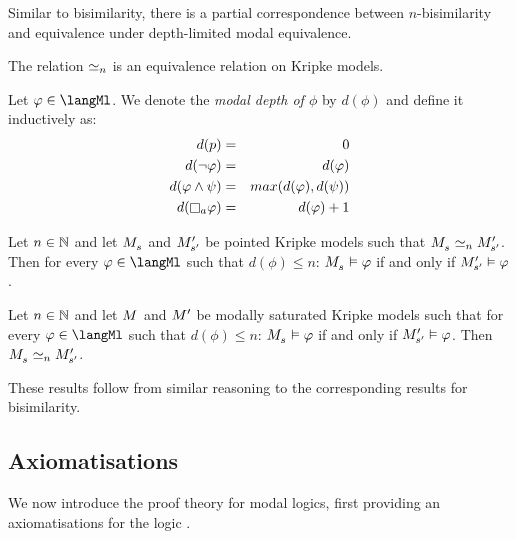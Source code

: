 Similar to bisimilarity, there is a partial correspondence between $n$-bisimilarity and equivalence under depth-limited modal equivalence.

\begin{proposition}
The relation $\bisimilar[n]$ is an equivalence relation on Kripke models.
\end{proposition}

\begin{definition}
Let $\phi \in \langMl$.
We denote the {\em modal depth of $\phi$} by $d(\phi)$ and define it inductively as:
\begin{eqnarray*}
    d(\atomP) &=& 0\\
    d(\lnot \phi) &=& d(\phi)\\
    d(\phi \land \psi) &=& max(d(\phi), d(\psi))\\
    d(\necessaryA \phi) &=& d(\phi) + 1
\end{eqnarray*}
\end{definition}

\begin{proposition}
Let $n \in \naturals$ and let $\kPModel{\kStateS}$ and $\kPModelP{\kStateSP}$ be pointed Kripke models such that $\kPModel{\kStateS} \bisimilar[n] \kPModelP{\kStateSP}$.
Then for every $\phi \in \langMl$ such that $d(\phi) \leq n$:
$\kPModel{\kStateS} \entails \phi$ if and only if $\kPModelP{\kStateSP} \entails \phi$.
\end{proposition}

\begin{proposition}
Let $n \in \naturals$ and let $\kModel$ and $\kModelP$ be modally saturated Kripke models such that for every $\phi \in \langMl$ such that $d(\phi) \leq n$: $\kPModel{\kStateS} \entails \phi$ if and only if $\kPModelP{\kStateSP} \entails \phi$.
Then $\kPModel{\kStateS} \bisimilar[n] \kPModelP{\kStateSP}$.
\end{proposition}

These results follow from similar reasoning to the corresponding results for bisimilarity.

\subsection{Axiomatisations}

We now introduce the proof theory for modal logics, first providing an axiomatisations for the logic \logicK{}.

